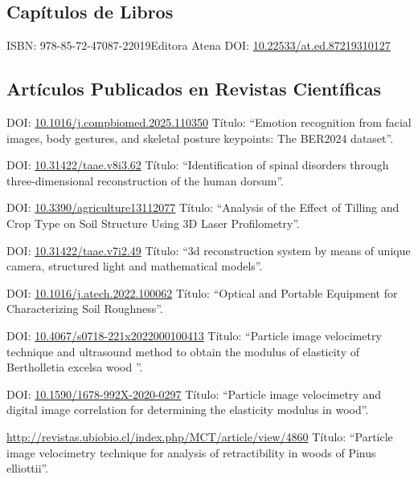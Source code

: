 \documentclass[11pt,a4paper,sans]{moderncv} %
\newcommand{\doiurl}[1]{\href{https://doi.org/#1}{#1}}
\begin{document}
\subsection{Capítulos de Libros}
	      {ISBN: 978-85-72-47087-2}{2019}{Editora Atena}
	      {DOI: \doiurl{10.22533/at.ed.87219310127}}

\subsection{Artículos Publicados en Revistas Científicas}

	      {DOI: \doiurl{10.1016/j.compbiomed.2025.110350} }{}{}
	      {Título: ``Emotion recognition from facial images, body gestures, and skeletal posture keypoints: The BER2024 dataset''.}
	      
	      {DOI: \doiurl{10.31422/taae.v8i3.62} }{}{}
	      {Título: ``Identification of spinal disorders through three-dimensional reconstruction of the human dorsum''.}
	      

	      {DOI: \doiurl{10.3390/agriculture13112077} }{}{}
	      {Título: ``Analysis of the Effect of Tilling and Crop Type on Soil Structure Using 3D Laser Profilometry''.}
	      
	      {DOI: \doiurl{10.31422/taae.v7i2.49} }{}{}
	      {Título: ``3d reconstruction system by means of unique camera, structured light and mathematical models''.}

	      {DOI: \doiurl{10.1016/j.atech.2022.100062} }{}{}
	      {Título: ``Optical and Portable Equipment for Characterizing Soil Roughness''.}
	      
	      {DOI: \doiurl{10.4067/s0718-221x2022000100413} }{}{}
	      {Título: ``Particle image velocimetry technique and ultrasound method to obtain the modulus of elasticity of Bertholletia excelsa wood ''.}
	      
	      {DOI: \doiurl{10.1590/1678-992X-2020-0297} }{}{}
	      {Título: ``Particle image velocimetry and digital image correlation for determining the elasticity modulus in wood''.}
	      
	      {\url{http://revistas.ubiobio.cl/index.php/MCT/article/view/4860}}{}{}
	      {Título: ``Particle image velocimetry technique for analysis of retractibility in woods of Pinus elliottii''.}
	      
\end{document}
